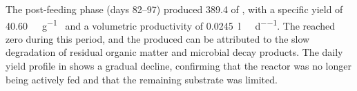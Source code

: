 The post-feeding phase (days \numrange[parse-numbers=false]{82}{97}) produced \qty{389.4}{\nml} of , with a specific yield of \qty{40.60}{\nml\CH\per\gram\VSfed} and a volumetric productivity of \qty{0.0245}{\litre\CH\per\reactorlitre\per\day}. The  reached zero during this period, and the  produced can be attributed to the slow degradation of residual organic matter and microbial decay products. The daily yield profile in  shows a gradual decline, confirming that the reactor was no longer being actively fed and that the remaining substrate was limited.

\begingroup


%

